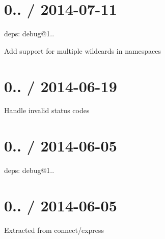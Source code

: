 \section*{0.. / 2014-\/07-\/11 }


\begin{DoxyItemize}
\item deps\+: debug@1..
\begin{DoxyItemize}
\item Add support for multiple wildcards in namespaces
\end{DoxyItemize}
\end{DoxyItemize}

\section*{0.. / 2014-\/06-\/19 }


\begin{DoxyItemize}
\item Handle invalid status codes
\end{DoxyItemize}

\section*{0.. / 2014-\/06-\/05 }


\begin{DoxyItemize}
\item deps\+: debug@1..
\end{DoxyItemize}

\section*{0.. / 2014-\/06-\/05 }


\begin{DoxyItemize}
\item Extracted from connect/express 
\end{DoxyItemize}